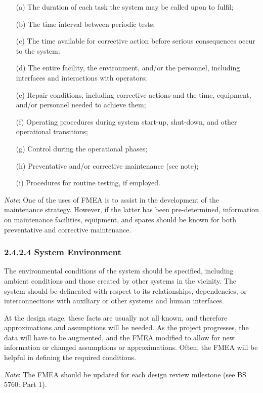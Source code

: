 \documentclass[./dissertation.tex]{subfiles}
\begin{document}
\begin{enumerate}
\item[(a)] The duration of each task the system may be called upon to fulfil;
\item[(b)] The time interval between periodic tests;
\item[(c)] The time available for corrective action before serious consequences occur to the system;
\item[(d)] The entire facility, the environment, and/or the personnel, including interfaces and interactions with operators;
\item[(e)] Repair conditions, including corrective actions and the time, equipment, and/or personnel needed to achieve them;
\item[(f)] Operating procedures during system start-up, shut-down, and other operational transitions;
\item[(g)] Control during the operational phases;
\item[(h)] Preventative and/or corrective maintenance (see note);
\item[(i)] Procedures for routine testing, if employed.
\end{enumerate}

\textit{Note}: One of the uses of FMEA is to assist in the development of the maintenance strategy. However, if the latter has been pre-determined, information on maintenance facilities, equipment, and spares should be known for both preventative and corrective maintenance.

\subsubsection{2.4.2.4 System Environment}

The environmental conditions of the system should be specified, including ambient conditions and those created by other systems in the vicinity. The system should be delineated with respect to its relationships, dependencies, or interconnections with auxiliary or other systems and human interfaces.

At the design stage, these facts are usually not all known, and therefore approximations and assumptions will be needed. As the project progresses, the data will have to be augmented, and the FMEA modified to allow for new information or changed assumptions or approximations. Often, the FMEA will be helpful in defining the required conditions.

\textit{Note}: The FMEA should be updated for each design review milestone (see BS 5760: Part 1).
\end{document}
